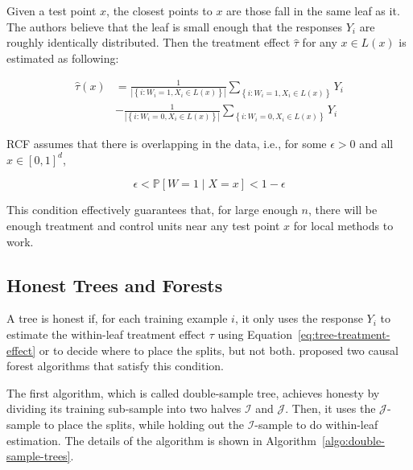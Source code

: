\documentclass{article}
\begin{document}
Given a test point $x$, the closest points to $x$ are those fall in the same
leaf as it. The authors believe that the leaf is small enough that the
responses $Y_i$ are roughly identically distributed. Then the
treatment effect $\hat{\tau}$ for any $x \in L(x)$ is estimated as
following:

\begin{align} 
\hat{\tau}(x) & = \frac{1}{\left | \left \{ i: W_i=1, X_i \in L(x) \right \}
                \right |} \sum_{\left \{ i: W_i = 1, X_i \in L(x)
                \right \}} Y_i \nonumber \\
              & - \frac{1}{\left | \left \{ i: W_i=0, X_i \in L(x) \right \}
  \right |} \sum_{\left \{ i: W_i = 0, X_i \in L(x) \right \}} Y_i \label{eq:tree-treatment-effect}
\end{align}

RCF assumes that
there is overlapping in the data, i.e., for some $\epsilon > 0$ and
all $x \in \left [ 0, 1\right ]^d$,

$$\epsilon < \mathbb{P}\left [ W=1 \mid X=x \right ] < 1-\epsilon$$

This condition effectively guarantees that, for large enough $n$,
there will be enough treatment and control units near any test point
$x$ for local methods to work.

\subsection{Honest Trees and Forests}
A tree is honest if, for each training example $i$, it only uses the
response $Y_i$ to estimate the within-leaf treatment effect $\tau$
using Equation~\ref{eq:tree-treatment-effect} or
to decide where to place the splits, but not
both. \cite{wager2015estimation} proposed two causal forest algorithms
that satisfy this condition.

The first algorithm, which is called double-sample tree, achieves
honesty by dividing its training sub-sample into two halves
$\mathcal{I}$ and $\mathcal{J}$. Then, it uses the
$\mathcal{J}$-sample to place the splits, while holding out the
$\mathcal{I}$-sample to do within-leaf estimation. The details of the
algorithm is shown in Algorithm~\ref{algo:double-sample-trees}.
\end{document}
